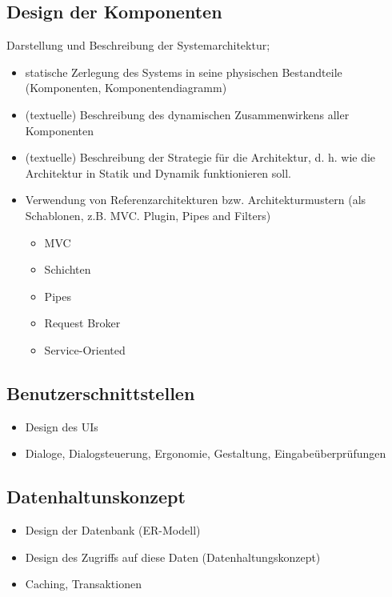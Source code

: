 \subsection{Design der Komponenten}

Darstellung und Beschreibung der Systemarchitektur;

\begin{itemize}
	\item  statische Zerlegung des Systems in seine physischen Bestandteile (Komponenten, Komponentendiagramm)
	\item (textuelle) Beschreibung des dynamischen Zusammenwirkens aller Komponenten 
	\item (textuelle) Beschreibung der Strategie für die Architektur, d. h. wie die Architektur in Statik und Dynamik funktionieren soll.
	\item Verwendung von Referenzarchitekturen bzw. Architekturmustern (als Schablonen, z.B. MVC. Plugin, Pipes and Filters)
	\begin{itemize}
		\item MVC
		\item Schichten
		\item Pipes
		\item Request Broker
		\item Service-Oriented
	\end{itemize}
\end{itemize}

\subsection{Benutzerschnittstellen} 
\begin{itemize}
	\item Design des UIs
	\item Dialoge, Dialogsteuerung, Ergonomie, Gestaltung, Eingabeüberprüfungen
\end{itemize}

\subsection{Datenhaltunskonzept}
\begin{itemize}
	\item Design der Datenbank (ER-Modell)
	\item Design des Zugriffs auf diese Daten (Datenhaltungskonzept)
	\item Caching, Transaktionen
\end{itemize}

